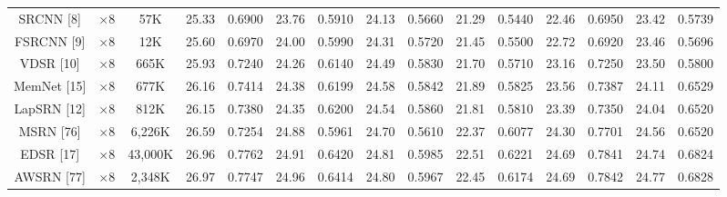 \documentclass[twocolumn]{svjour3}          %
\begin{document}
\begin{table}
\begin{tabular}{|c|c|c|cc|cc|cc|cc|cc|cc|}
SRCNN [8] & $\times8$ &57K& \multicolumn{1}{c|}{25.33} & 0.6900 & \multicolumn{1}{c|}{23.76} &0.5910 &\multicolumn{1}{c|}{24.13} &0.5660 & \multicolumn{1}{c|}{21.29} &0.5440& \multicolumn{1}{c|}{22.46} &0.6950
&\multicolumn{1}{c|}{23.42} & 0.5739      \\

FSRCNN [9]& $\times8$&12K& \multicolumn{1}{c|}{25.60} &0.6970 & \multicolumn{1}{c|}{24.00} &0.5990&\multicolumn{1}{c|}{24.31} &0.5720 & \multicolumn{1}{c|}{21.45} &0.5500 & \multicolumn{1}{c|}{22.72} & 0.6920
&\multicolumn{1}{c|}{23.46} &  0.5696      \\

VDSR [10]& $\times8$&665K& \multicolumn{1}{c|}{25.93} &0.7240& \multicolumn{1}{c|}{24.26} &0.6140 &\multicolumn{1}{c|}{24.49} &0.5830 & \multicolumn{1}{c|}{21.70} &0.5710 & \multicolumn{1}{c|}{23.16} &0.7250
&\multicolumn{1}{c|}{23.50} & 0.5800       \\

MemNet [15]& $\times8$&677K& \multicolumn{1}{c|}{26.16} &  0.7414 & \multicolumn{1}{c|}{24.38} & 0.6199&\multicolumn{1}{c|}{24.58} & 0.5842 & \multicolumn{1}{c|}{21.89  } &0.5825 & \multicolumn{1}{c|}{23.56 } &0.7387
&\multicolumn{1}{c|}{24.11  } &  0.6529       \\

LapSRN [12]& $\times8$&812K& \multicolumn{1}{c|}{26.15} &0.7380& \multicolumn{1}{c|}{24.35} &0.6200 &\multicolumn{1}{c|}{24.54} &0.5860 & \multicolumn{1}{c|}{21.81} &0.5810 & \multicolumn{1}{c|}{23.39} &0.7350
&\multicolumn{1}{c|}{24.04} & 0.6520       \\

MSRN [76]& $\times8$&6,226K& \multicolumn{1}{c|}{26.59} &  0.7254 & \multicolumn{1}{c|}{24.88} & 0.5961&\multicolumn{1}{c|}{24.70} & 0.5610 & \multicolumn{1}{c|}{22.37 } & 0.6077 & \multicolumn{1}{c|}{24.30 } &0.7701 &\multicolumn{1}{c|}{24.56  } &  0.6520       \\

EDSR [17]& $\times8$&43,000K& \multicolumn{1}{c|}{26.96} &  0.7762 & \multicolumn{1}{c|}{24.91} & 0.6420&\multicolumn{1}{c|}{24.81} & 0.5985 & \multicolumn{1}{c|}{22.51  } &0.6221 & \multicolumn{1}{c|}{24.69 } &0.7841
&\multicolumn{1}{c|}{24.74  } &  0.6824       \\

AWSRN [77]& $\times8$&2,348K& \multicolumn{1}{c|}{26.97} &  0.7747 & \multicolumn{1}{c|}{24.96} & 0.6414&\multicolumn{1}{c|}{24.80} & 0.5967 & \multicolumn{1}{c|}{22.45  } &0.6174 & \multicolumn{1}{c|}{24.69 } &0.7842 &\multicolumn{1}{c|}{24.77  } &  0.6828       \\


\end{tabular}
\end{table}
\end{document}
